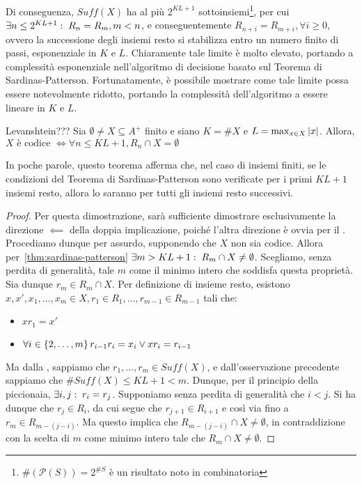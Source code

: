 Di conseguenza, \(Suff(X)\) ha al più \(2^{KL+1}\) sottoinsiemi\footnote{\(\#(\mathcal{P}(S)) = 2^{\#S}\) è un risultato noto in combinatoria}, per cui \(\exists n \leq 2^{KL+1} :\; R_n = R_m, m < n\), e conseguentemente \(R_{n+i} = R_{m+i}, \forall i \geq 0\), ovvero la successione degli insiemi resto si stabilizza entro un numero finito di passi, esponenziale in \(K\) e \(L\).
Chiaramente tale limite è molto elevato, portando a complessità esponenziale nell'algoritmo di decisione basato sul Teorema di Sardinas-Patterson.
Fortunatamente, è possibile mostrare come tale limite possa essere notevolmente ridotto, portando la complessità dell'algoritmo a essere lineare in \(K\) e \(L\).
\begin{theorem}{Levanshtein???}
  Sia \(\emptyset \neq X \subseteq A^+\) finito e siano \(K = \# X\) e \(L = \max_{x \in X} \left|x\right|\).
  Allora, \(X \text{ è codice } \iff \forall n \leq KL +1, R_n \cap X = \emptyset\)
\end{theorem}

In poche parole, questo teorema afferma che, nel caso di insiemi finiti, se le condizioni del Teorema di Sardinas-Patterson sono verificate per i primi \(KL+1\) insiemi resto, allora lo saranno per tutti gli insiemi resto successivi.

\begin{proof}
  Per questa dimostrazione, sarà sufficiente dimostrare esclusivamente la direzione \(\impliedby\) della doppia implicazione, poiché l'altra direzione è ovvia per il .
  Procediamo dunque per assurdo, supponendo che \(X\) non sia codice. Allora per~\ref{thm:sardinas-patterson} \(\exists m > KL + 1 :\; R_m \cap X \neq \emptyset\).
  Scegliamo, senza perdita di generalità, tale \(m\) come il minimo intero che soddisfa questa proprietà.
  Sia dunque \(r_m \in R_m \cap X\). Per definizione di insieme resto, esistono \(x,x',x_1,\ldots,x_m \in X, r_1\in R_1,\ldots,r_{m-1} \in R_{m-1}\) tali che:
  \begin{itemize}
    \item \(xr_1=x'\) 
    \item \(\forall i \in \set{2,\ldots,m} r_{i-1}r_i=x_i \lor xr_i = r_{i-1}\)
  \end{itemize}
  Ma dalla , sappiamo che \(r_1,\ldots,r_m \in Suff(X)\), e dall'osservazione precedente sappiamo che \(\# Suff(X) \leq KL + 1 < m\).
  Dunque, per il principio della piccionaia, \(\exists i,j :\; r_i=r_j\). Supponiamo senza perdita di generalità che \(i<j\).
  Si ha dunque che \(r_j \in R_i\), da cui segue che \(r_{j+1} \in R_{i+1}\) e così via fino a \(r_m \in R_{m-(j-i)}\).
  Ma questo implica che \(R_{m-(j-i)} \cap X \neq \emptyset\), in contraddizione con la scelta di \(m\) come minimo intero tale che \(R_m \cap X \neq \emptyset\).
\end{proof}

